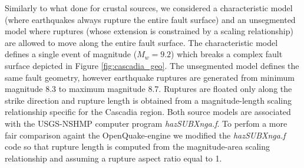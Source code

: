 Similarly to what done for crustal sources, we considered a characteristic model (where earthquakes always rupture the entire fault surface) and an unsegmented model where ruptures (whose extension is constrained by a scaling relationship) are allowed to move along the entire fault surface. The characteristic model defines a single event of magnitude ($M_{w}=9.2$) which breaks a complex fault surface depicted in Figure \ref{fig:cascadia_geo}. The unsegmented model defines the same fault geometry, however earthquake ruptures are generated from minimum magnitude 8.3 to maximum magnitude 8.7. Ruptures are floated only along the strike direction and rupture length is obtained from a magnitude-length scaling relationship specific for the Cascadia region. Both source models are associated with the USGS-NSHMP computer program \textit{hazSUBXnga.f}. To perfom a more fair comparison againt the OpenQuake-engine we modified the \textit{hazSUBXnga.f} code so that rupture length is computed from the \citet{wells1994} magnitude-area scaling relationship and assuming a rupture aspect ratio equal to 1.

